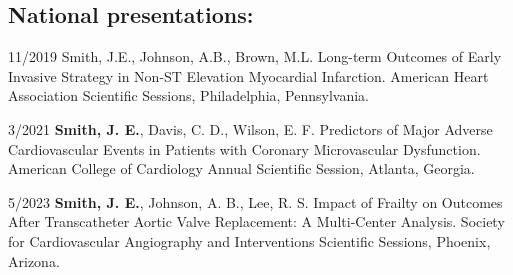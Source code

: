 \documentclass{article}
\newcommand{\cvsubsection}[1]{\subsection*{\rmfamily\hspace{1.5em}#1}}
\newcommand{\presentationliststart}{\begin{description}[font=\normalfont,
    labelindent=2em,leftmargin=7em,style=nextline]}
\newcommand{\presentationlistend}{\end{description}}
\begin{document}
\cvsubsection{National presentations:}

\presentationliststart
    \item[11/2019] Smith, J.E., Johnson, A.B., Brown, M.L. Long-term Outcomes of Early Invasive Strategy in Non-ST Elevation Myocardial Infarction.
    American Heart Association Scientific Sessions, Philadelphia, Pennsylvania.
    \item[3/2021] \textbf{Smith, J. E.}, Davis, C. D., Wilson, E. F. Predictors of Major Adverse Cardiovascular Events
    in Patients with Coronary Microvascular Dysfunction.
    American College of Cardiology Annual Scientific Session,
    Atlanta, Georgia.
    \item[5/2023] \textbf{Smith, J. E.}, Johnson, A. B., Lee, R. S. Impact of Frailty on Outcomes After
    Transcatheter Aortic Valve Replacement: A Multi-Center Analysis.
    Society for Cardiovascular Angiography and Interventions Scientific Sessions, Phoenix, Arizona.
\presentationlistend
\end{document}
